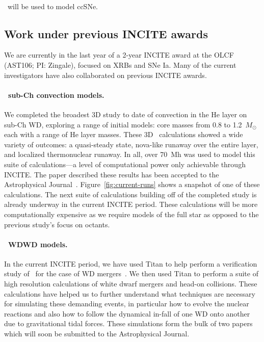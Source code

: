 \documentclass[11pt,letterpaper,english]{article}
\begin{document}
\paragraph{\chimera}
%
\chimera\ will be used to model ccSNe.  

\subsection{Work under previous INCITE awards}

We are currently in the last year of a 2-year INCITE award at the OLCF
(AST106; PI: Zingale), focused on XRBs and SNe Ia.  Many of the
current investigators have also collaborated on previous INCITE
awards.  

\paragraph{\maestro\ sub-Ch convection models.}
%
We completed the broadest 3D study to date of convection in the He layer
on sub-Ch WD, exploring a range of initial
models: core masses from 0.8 to 1.2~$M_\odot$ each with a range of He layer masses.
These 3D \maestro\ calculations showed a wide variety of outcomes:
a quasi-steady state, nova-like runaway over the entire layer, and 
localized thermonuclear runaway.  In all, over 70~Mh was
used to model this suite of calculations---a level of computational
power only achievable through INCITE.  The paper described these
results has been accepted to the Astrophysical
Journal~\cite{jacobs:2016}.  Figure~\ref{fig:current-runs} shows a
snapshot of one of these calculations.  The next suite of calculations building
off of the completed study is already underway in the current INCITE period.
These calculations will be more computationally expensive as we require
models of the full star as opposed to the previous study's focus on octants.

\paragraph{\castro\ WDWD models.}
%
In the current INCITE period, we have used Titan to help perform
a verification study of \castro\ for the case of WD mergers~\cite{katz:2016}.
We then used Titan to perform a suite of high resolution calculations
of white dwarf mergers and head-on collisions. These calculations have
helped us to further understand what techniques are necessary for
simulating these demanding events, in particular how to evolve the
nuclear reactions and also how to follow the dynamical in-fall of
one WD onto another due to gravitational tidal forces. These simulations
form the bulk of two papers which will soon be submitted to the
Astrophysical Journal.
\end{document}
